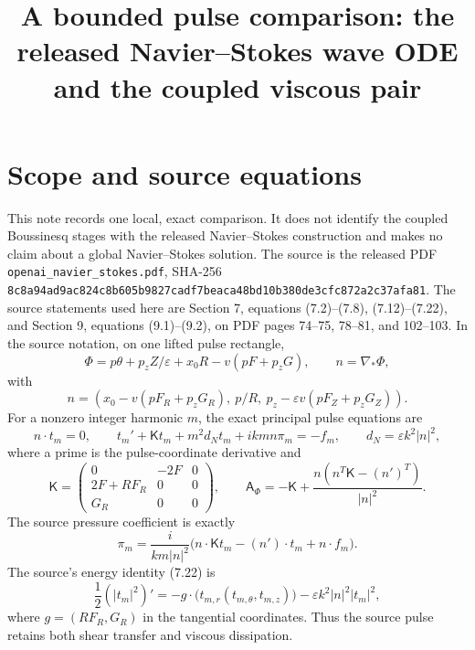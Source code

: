 \documentclass[11pt]{article}
\title{A bounded pulse comparison: the released Navier--Stokes wave ODE and the coupled viscous pair}
\author{}
\date{}
\begin{document}
\maketitle
\sloppy

\section{Scope and source equations}
This note records one local, exact comparison.  It does not identify the
coupled Boussinesq stages with the released Navier--Stokes construction and
makes no claim about a global Navier--Stokes solution.  The source is the
released PDF \texttt{openai\_navier\_stokes.pdf}, SHA-256
\texttt{8c8a94ad9ac824c8b605b9827cadf7beaca48bd10b380de3cfc872a2c37afa81}.
The source statements used here are Section 7, equations (7.2)--(7.8),
(7.12)--(7.22), and Section 9, equations (9.1)--(9.2), on PDF pages 74--75,
78--81, and 102--103.  In the source notation, on one lifted pulse rectangle,
\begin{equation}
 \Phi=p\theta+p_zZ/\varepsilon+x_0R-v(pF+p_zG),\qquad
 n=\nabla_*\Phi,
\end{equation}
with
\begin{equation}
 n=(x_0-v(pF_R+p_zG_R),\ p/R,\ p_z-\varepsilon v(pF_Z+p_zG_Z)).
 \label{eq:nsource}
\end{equation}
For a nonzero integer harmonic $m$, the exact principal pulse equations are
\begin{equation}
 n\cdot t_m=0,\qquad
 t_m'+\mathsf Kt_m+m^2d_Nt_m+ikm n\pi_m=-f_m,
 \qquad d_N=\varepsilon k^2|n|^2,
 \label{eq:sourcepulse}
\end{equation}
where a prime is the pulse-coordinate derivative and
\begin{equation}
 \mathsf K=\begin{pmatrix}0&-2F&0\\2F+RF_R&0&0\\G_R&0&0\end{pmatrix},\qquad
 \mathsf A_\Phi=-\mathsf K+\frac{n(n^T\mathsf K-(n')^T)}{|n|^2}.
 \label{eq:sourceoperator}
\end{equation}
The source pressure coefficient is exactly
\begin{equation}
 \pi_m=\frac{i}{km|n|^2}\bigl(n\cdot\mathsf Kt_m-(n')\cdot t_m+n\cdot f_m\bigr).
 \label{eq:sourcepressure}
\end{equation}
The source's energy identity (7.22) is
\begin{equation}
 \frac12(|t_m|^2)'=-g\cdot\bigl(t_{m,r}(t_{m,\theta},t_{m,z})\bigr)
 -\varepsilon k^2|n|^2|t_m|^2,
 \label{eq:sourceenergy}
\end{equation}
where $g=(RF_R,G_R)$ in the tangential coordinates.  Thus the source pulse
retains both shear transfer and viscous dissipation.
\end{document}

